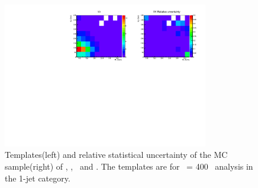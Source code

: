 \begin{figure}[htp]
\includegraphics[width=0.8\textwidth]{figures/2dtemplate_VV_mH400_1j.pdf}
\caption{Templates(left) and relative statistical uncertainty of the MC sample(right) 
of \qqww, \ggww, \topbkg\ and \vv. 
The templates are for \mHi\ = 400 \GeV\ analysis in the 1-jet category.}
\label{fig:2dtemplate_400_1j_2}
\end{figure}

